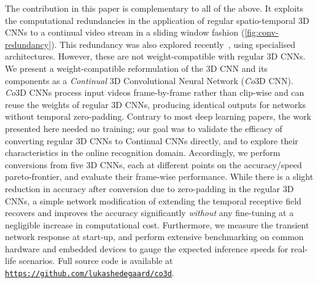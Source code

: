The contribution in this paper is complementary to all of the above. It exploits the computational redundancies in the application of regular spatio-temporal 3D CNNs to a continual video stream in a sliding window fashion (\cref{fig:conv-redundancy}).
This redundancy was also explored recently~\cite{kopuklu2020dissected}, \cite{singh2019recurrent} using specialised architectures. However, these are not weight-compatible with regular 3D CNNs.
We present a weight-compatible reformulation of the 3D CNN and its components as a \mbox{\textit{Continual}} 3D Convolutional Neural Network (\textit{Co}3D CNN).
\textit{Co}3D CNNs process input videos frame-by-frame rather than clip-wise and can reuse the weights of regular 3D CNNs, producing identical outputs for networks without temporal zero-padding. 
Contrary to most deep learning papers, the work presented here needed no training; our goal was to validate the efficacy of converting regular 3D CNNs to Continual CNNs directly, and to explore their characteristics in the online recognition domain.
Accordingly, 
we perform conversions from five 3D CNNs, each at different points on the accuracy/speed pareto-frontier, and evaluate their frame-wise performance.
While there is a slight reduction in accuracy after conversion due to zero-padding in the regular 3D CNNs, a simple network modification of extending the temporal receptive field recovers and improves the accuracy significantly \textit{without} any fine-tuning at a negligible increase in computational cost.
Furthermore, we measure the transient network response at start-up, and perform extensive benchmarking on common hardware and embedded devices to gauge the expected inference speeds for real-life scenarios.
Full source code is available at \texttt{\url{https://github.com/lukashedegaard/co3d}}.



